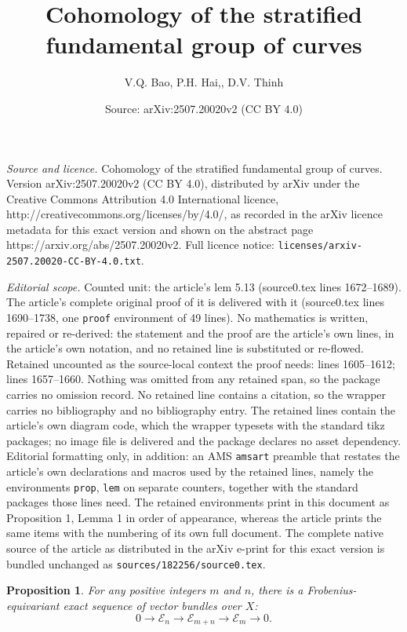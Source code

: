 \documentclass[10pt,a4paper]{amsart}
\title{Cohomology of the stratified fundamental group of curves}
\author{V.Q. Bao, P.H. Hai,, D.V. Thinh}
\date{Source: arXiv:2507.20020v2 (CC BY 4.0)}
\newtheorem{prop}{Proposition}
\begin{document}
\maketitle

\noindent\emph{Source and licence.} Cohomology of the stratified fundamental group of curves. Version arXiv:2507.20020v2 (CC BY 4.0), distributed by arXiv under the Creative Commons Attribution 4.0 International licence, http://creativecommons.org/licenses/by/4.0/, as recorded in the arXiv licence metadata for this exact version and shown on the abstract page https://arxiv.org/abs/2507.20020v2. Full licence notice: \texttt{licenses/arxiv-2507.20020-CC-BY-4.0.txt}.\par\smallskip

\noindent\textit{Editorial scope.} Counted unit: the article's lem 5.13 (source0.tex lines 1672--1689). The article's complete original proof of it is delivered with it (source0.tex lines 1690--1738, one \texttt{proof} environment of 49 lines). No mathematics is written, repaired or re-derived: the statement and the proof are the article's own lines, in the article's own notation, and no retained line is substituted or re-flowed.  Retained uncounted as the source-local context the proof needs: lines 1605--1612; lines 1657--1660.  Nothing was omitted from any retained span, so the package carries no omission record.  No retained line contains a citation, so the wrapper carries no bibliography and no bibliography entry.  The retained lines contain the article's own diagram code, which the wrapper typesets with the standard tikz packages; no image file is delivered and the package declares no asset dependency.  Editorial formatting only, in addition: an AMS \texttt{amsart} preamble that restates the article's own declarations and macros used by the retained lines, namely the environments \texttt{prop}, \texttt{lem} on separate counters, together with the standard packages those lines need.  The retained environments print in this document as Proposition 1, Lemma 1 in order of appearance, whereas the article prints the same items with the numbering of its own full document.  The complete native source of the article as distributed in the arXiv e-print for this exact version is bundled unchanged as \texttt{sources/182256/source0.tex}.
\begin{prop}\label{exact sequence of En}
For any positive integers $m$ and $n$, there is a Frobenius-equivariant
exact sequence of vector bundles over $X$:
\[
0 \longrightarrow \mathcal E_n \longrightarrow \mathcal E_{m+n}
\longrightarrow \mathcal E_m \longrightarrow 0.
\]
\end{prop}
\end{document}
